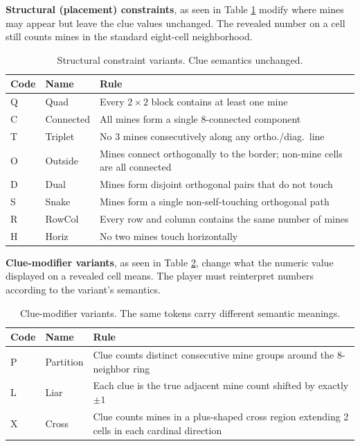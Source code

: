 \documentclass[11pt,conference,compsoc]{IEEEtran}
\begin{document}
\textbf{Structural (placement) constraints}, as seen in Table \ref{tab:structural} modify where mines may appear but leave
the clue values unchanged. The revealed number on a cell still counts mines in the
standard eight-cell neighborhood.
\begin{table}[htp]
\centering
\small
\begin{tabularx}{\columnwidth}{@{}llX@{}}
\toprule
Code & Name & Rule \\
\midrule
Q & Quad      & Every $2{\times}2$ block contains at least one mine \\
C & Connected & All mines form a single 8-connected component \\
T & Triplet   & No 3 mines consecutively along any ortho./diag.\ line \\
O & Outside   & Mines connect orthogonally to the border; non-mine cells are all connected \\
D & Dual      & Mines form disjoint orthogonal pairs that do not touch \\
S & Snake     & Mines form a single non-self-touching orthogonal path \\
R & RowCol    & Every row and column contains the same number of mines \\
H & Horiz     & No two mines touch horizontally \\
\bottomrule
\end{tabularx}
\vspace{1pt}
\caption{Structural constraint variants. Clue semantics unchanged.}
\label{tab:structural}

\end{table}

\textbf{Clue-modifier variants}, as seen in Table \ref{tab:cluemod}, change what the numeric value displayed on a revealed cell means. The player must reinterpret numbers according to the variant's semantics.

\begin{table}[htp]
\centering
\small
\begin{tabularx}{\columnwidth}{@{}llX@{}}
\toprule
Code & Name & Rule \\
\midrule
P & Partition & Clue counts distinct consecutive mine groups around the 8-neighbor ring \\
L & Liar      & Each clue is the true adjacent mine count shifted by exactly $\pm 1$ \\
X & Cross     & Clue counts mines in a plus-shaped cross region extending 2 cells in each cardinal direction \\
\bottomrule
\end{tabularx}
\vspace{1pt}
\caption{Clue-modifier variants. The same tokens carry different semantic meanings.}
\label{tab:cluemod}

\end{table}
\end{document}
